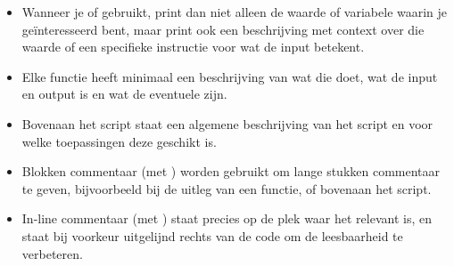\documentclass[a4paper,11pt, fleqn]{article}
\begin{document}
\begin{itemize}
\item Wanneer je  of  gebruikt, print dan niet alleen de waarde of variabele waarin je ge\"interesseerd bent, maar print ook een beschrijving met context over die waarde of een specifieke instructie voor wat de input betekent.
\item Elke functie heeft minimaal een beschrijving van wat die doet, wat de input en output is en wat de eventuele  zijn.
\item Bovenaan het script staat een algemene beschrijving van het script en voor welke toepassingen deze geschikt is.
\item Blokken commentaar (met ) worden gebruikt om lange stukken commentaar te geven, bijvoorbeeld bij de uitleg van een functie, of bovenaan het script.
\item In-line commentaar (met ) staat precies op de plek waar het relevant is, en staat bij voorkeur uitgelijnd rechts van de code om de leesbaarheid te verbeteren.
\end{itemize}
\end{document}
